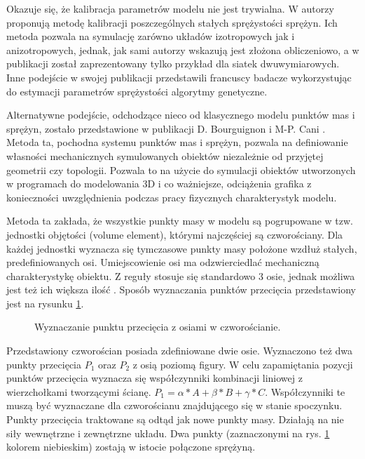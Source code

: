 Okazuje się, że kalibracja parametrów modelu nie jest trywialna. W \cite{usa}
autorzy proponują metodę kalibracji poszczególnych stałych sprężystości sprężyn.
Ich metoda pozwala na symulację zarówno układów izotropowych jak i anizotropowych,
jednak, jak sami autorzy wskazują jest złożona obliczeniowo, a w publikacji
został zaprezentowany tylko przykład dla siatek dwuwymiarowych. Inne podejście
w swojej publikacji przedstawili francuscy badacze wykorzystując do estymacji
parametrów sprężystości algorytmy genetyczne.\cite{ei}

Alternatywne podejście, odchodzące nieco od klasycznego modelu punktów mas i
sprężyn, zostało przedstawione w publikacji D. Bourguignon i M-P. Cani
\cite{ca}. Metoda ta, pochodna systemu punktów mas i sprężyn, pozwala na
definiowanie własności mechanicznych symulowanych obiektów niezależnie od
przyjętej geometrii czy topologii. Pozwala to na użycie do symulacji obiektów
utworzonych w programach do modelowania 3D i co ważniejsze, odciążenia grafika z
konieczności uwzględnienia podczas pracy fizycznych charakterystyk
modelu.\cite{ca}

Metoda ta zakłada, że wszystkie punkty masy w modelu są pogrupowane w tzw. jednostki
objętości (volume element), którymi najczęściej są czworościany. Dla każdej
jednostki wyznacza się tymczasowe punkty masy położone wzdłuż stałych,
		  predefiniowanych osi. Umiejscowienie osi ma odzwierciedlać mechaniczną
		  charakterystykę obiektu. Z reguły stosuje się standardowo 3 osie,
		  jednak możliwa jest też ich większa ilość \cite{ca}. Sposób
		  wyznaczania punktów przecięcia przedstawiony jest na rysunku
		  \ref{anizotropia-czworoscian}.

\begin{figure}[ht]
\centering

\caption{Wyznaczanie punktu przecięcia z osiami w czworościanie.}
\label{anizotropia-czworoscian}
\end{figure}

Przedstawiony czworościan posiada zdefiniowane dwie osie. Wyznaczono też dwa
punkty przecięcia $P_1$ oraz $P_2$ z osią poziomą figury. W celu zapamiętania
pozycji punktów przecięcia wyznacza się współczynniki kombinacji liniowej z
wierzchołkami tworzącymi ścianę. $P_1 = \alpha * A + \beta *B + \gamma *C$.
Współczynniki te muszą być wyznaczane dla czworościanu znajdującego się w stanie
spoczynku. Punkty przecięcia traktowane są odtąd jak nowe punkty masy. Działają
na nie siły wewnętrzne i zewnętrzne układu. Dwa punkty (zaznaczonymi na rys.
		\ref{anizotropia-czworoscian} kolorem niebieskim) zostają w istocie
połączone sprężyną.


